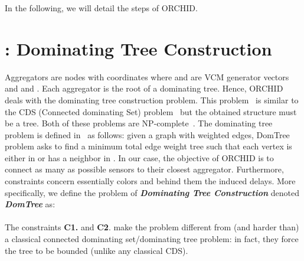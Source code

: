 In the following, we will detail the steps of ORCHID.

\section{: Dominating Tree Construction}\label{sec:aggregators}
Aggregators are nodes with coordinates  where  and  are VCM generator vectors and  and . Each aggregator is the root of a dominating tree.
Hence, ORCHID deals with the dominating tree construction problem. This problem~\cite{CDSExample1, CDSExample2} is similar to the CDS (Connected dominating Set) problem~\cite{CDSSurvey} but the obtained structure must be a tree. Both of these problems are NP-complete~\cite{CDSSurvey, CDSExample1}. The dominating tree problem is defined in~\cite{CDSExample1} as follows: given a graph  with weighted edges, DomTree problem asks to find a minimum total edge weight tree  such that each vertex is either in  or has a neighbor in . In our case, the objective of ORCHID is to connect as many as possible sensors to their closest aggregator. Furthermore, constraints concern essentially colors and behind them the induced delays. More specifically, we define the problem of \textbf{\textit{Dominating Tree Construction}} denoted \textbf{\textit{DomTree}} as: \\
~~\\
The constraints \textbf{C1.} and \textbf{C2}. make the problem different
from (and harder than) a classical connected dominating set/dominating tree 
problem: in fact, they force the tree to be bounded (unlike any 
classical CDS). \\





